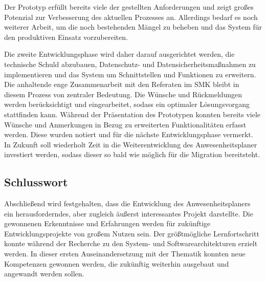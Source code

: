 Der Prototyp erfüllt bereits viele der gestellten Anforderungen und zeigt großes Potenzial zur Verbesserung des aktuellen Prozesses an. Allerdings bedarf es noch weiterer Arbeit, um die noch bestehenden Mängel zu beheben und das System für den produktiven Einsatz vorzubereiten.

Die zweite Entwicklungsphase wird daher darauf ausgerichtet werden, die technische Schuld abzubauen, Datenschutz- und Datensicherheitsmaßnahmen zu implementieren und das System um Schnittstellen und Funktionen zu erweitern. Die anhaltende enge Zusammenarbeit mit den Referaten im SMK bleibt in diesem Prozess von zentraler Bedeutung. Die Wünsche und Rückmeldungen werden berücksichtigt und eingearbeitet, sodass ein optimaler Lösungsvorgang stattfinden kann. Während der Präsentation des Prototypen konnten bereits viele Wünsche und Anmerkungen in Bezug zu erweiterten Funktionalitäten erfasst werden. Diese wurden notiert und für die nächste Entwicklungsphase vermerkt. In Zukunft soll wiederholt Zeit in die Weiterentwicklung des Anwesenheitsplaner investiert werden, sodass dieser so bald wie möglich für die Migration bereitsteht.

\subsection{Schlusswort}
\label{sec:Abschluss}

Abschließend wird festgehalten, dass die Entwicklung des Anwesenheitsplaners ein herausforderndes, aber zugleich äußerst interessantes Projekt darstellte. Die gewonnenen Erkenntnisse und Erfahrungen werden für zukünftige Entwicklungsprojekte von großem Nutzen sein. Der größtmögliche Lernfortschritt konnte während der Recherche zu den System- und Softwarearchitekturen erzielt werden. In dieser ersten Auseinandersetzung mit der Thematik konnten neue Kompetenzen gewonnen werden, die zukünftig weiterhin ausgebaut und angewandt werden sollen.

